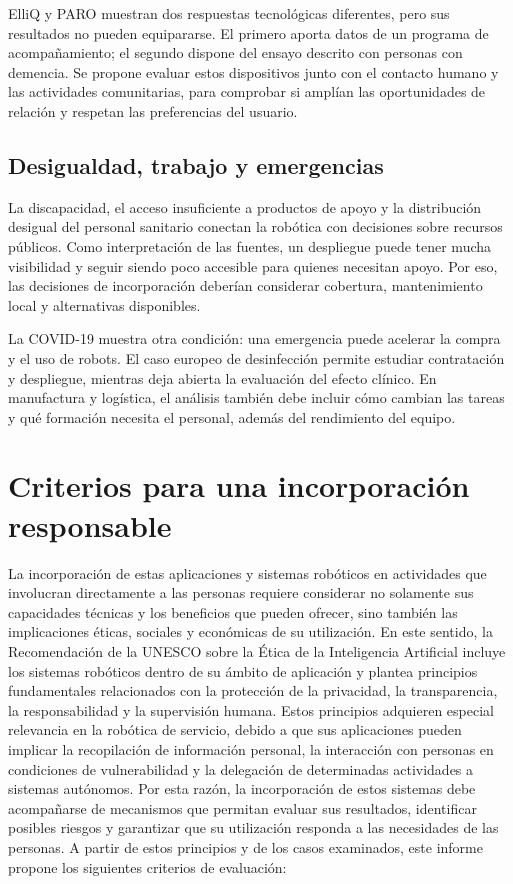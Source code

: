 \documentclass[11pt,a4paper]{article}
\begin{document}
ElliQ y PARO muestran dos respuestas tecnológicas diferentes, pero sus resultados no pueden equipararse. El primero aporta datos de un programa de acompañamiento; el segundo dispone del ensayo descrito con personas con demencia. Se propone evaluar estos dispositivos junto con el contacto humano y las actividades comunitarias, para comprobar si amplían las oportunidades de relación y respetan las preferencias del usuario.

\subsection{Desigualdad, trabajo y emergencias}
La discapacidad, el acceso insuficiente a productos de apoyo y la distribución desigual del personal sanitario conectan la robótica con decisiones sobre recursos públicos.\cite{omsdiscapacidad,omstech,omsenfermeria} Como interpretación de las fuentes, un despliegue puede tener mucha visibilidad y seguir siendo poco accesible para quienes necesitan apoyo. Por eso, las decisiones de incorporación deberían considerar cobertura, mantenimiento local y alternativas disponibles.

La COVID-19 muestra otra condición: una emergencia puede acelerar la compra y el uso de robots. El caso europeo de desinfección permite estudiar contratación y despliegue, mientras deja abierta la evaluación del efecto clínico.\cite{uvdfinal} En manufactura y logística, el análisis también debe incluir cómo cambian las tareas y qué formación necesita el personal, además del rendimiento del equipo.

\section{Criterios para una incorporación responsable}
La incorporación de estas aplicaciones y sistemas robóticos en actividades que involucran directamente a las personas requiere considerar no solamente sus capacidades técnicas y los beneficios que pueden ofrecer, sino también las implicaciones éticas, sociales y económicas de su utilización. En este sentido, la Recomendación de la UNESCO sobre la Ética de la Inteligencia Artificial incluye los sistemas robóticos dentro de su ámbito de aplicación y plantea principios fundamentales relacionados con la protección de la privacidad, la transparencia, la responsabilidad y la supervisión humana. \cite{unesco} Estos principios adquieren especial relevancia en la robótica de servicio, debido a que sus aplicaciones pueden implicar la recopilación de información personal, la interacción con personas en condiciones de vulnerabilidad y la delegación de determinadas actividades a sistemas autónomos. Por esta razón, la incorporación de estos sistemas debe acompañarse de mecanismos que permitan evaluar sus resultados, identificar posibles riesgos y garantizar que su utilización responda a las necesidades de las personas. A partir de estos principios y de los casos examinados, este informe propone los siguientes criterios de evaluación:
\end{document}
